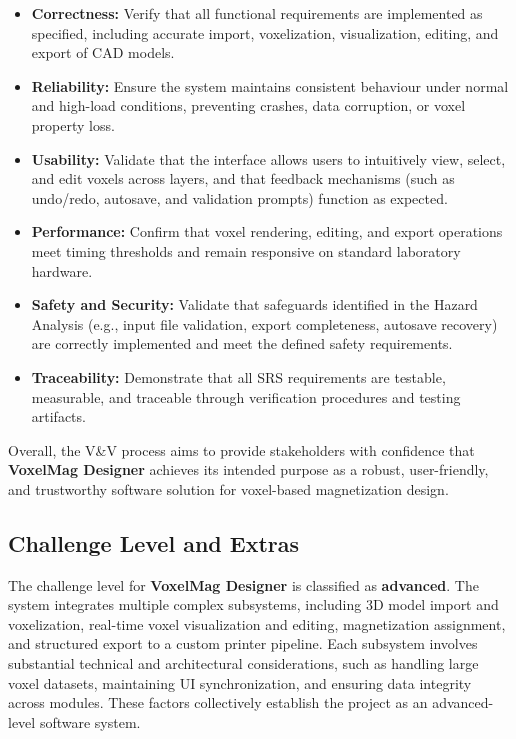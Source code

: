 \documentclass[12pt, titlepage]{article}
\begin{document}
\begin{itemize}
  \item \textbf{Correctness:} Verify that all functional requirements are implemented as specified, including accurate import, voxelization, visualization, editing, and export of CAD models.
  \item \textbf{Reliability:} Ensure the system maintains consistent behaviour under normal and high-load conditions, preventing crashes, data corruption, or voxel property loss.
  \item \textbf{Usability:} Validate that the interface allows users to intuitively view, select, and edit voxels across layers, and that feedback mechanisms (such as undo/redo, autosave, and validation prompts) function as expected.
  \item \textbf{Performance:} Confirm that voxel rendering, editing, and export operations meet timing thresholds and remain responsive on standard laboratory hardware.
  \item \textbf{Safety and Security:} Validate that safeguards identified in the Hazard Analysis (e.g., input file validation, export completeness, autosave recovery) are correctly implemented and meet the defined safety requirements.
  \item \textbf{Traceability:} Demonstrate that all SRS requirements are testable, measurable, and traceable through verification procedures and testing artifacts.
\end{itemize}

Overall, the V\&V process aims to provide stakeholders with confidence that \textbf{VoxelMag Designer} achieves its intended purpose as a robust, user-friendly, and trustworthy software solution for voxel-based magnetization design.

\subsection{Challenge Level and Extras}

The challenge level for \textbf{VoxelMag Designer} is classified as \textbf{advanced}. The system integrates multiple complex subsystems, including 3D model import and voxelization, real-time voxel visualization and editing, magnetization assignment, and structured export to a custom printer pipeline. Each subsystem involves substantial technical and architectural considerations, such as handling large voxel datasets, maintaining UI synchronization, and ensuring data integrity across modules. These factors collectively establish the project as an advanced-level software system.
\end{document}
